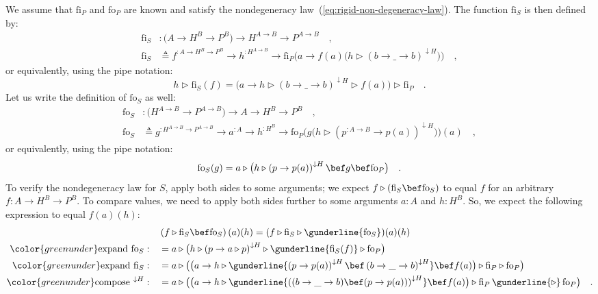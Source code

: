 We assume that $\text{fi}_{P}$ and $\text{fo}_{P}$ are known and
satisfy the nondegeneracy law~(\ref{eq:rigid-non-degeneracy-law}).
The function $\text{fi}_{S}$ is then defined by:
\begin{align*}
\text{fi}_{S} & :\big(A\rightarrow H^{B}\rightarrow P^{B}\big)\rightarrow H^{A\rightarrow B}\rightarrow P^{A\rightarrow B}\quad,\\
\text{fi}_{S} & \triangleq f^{:A\rightarrow H^{B}\rightarrow P^{B}}\rightarrow h^{:H^{A\rightarrow B}}\rightarrow\text{fi}_{P}\big(a\rightarrow f(a)\big(h\triangleright(b\rightarrow\_\rightarrow b)^{\downarrow H}\big)\big)\quad,
\end{align*}
or equivalently, using the pipe notation:
\[
h\triangleright\text{fi}_{S}(f)=\big(a\rightarrow h\triangleright\left(b\rightarrow\_\rightarrow b\right)^{\downarrow H}\triangleright f(a)\big)\triangleright\text{fi}_{P}\quad.
\]
Let us write the definition of $\text{fo}_{S}$ as well:
\begin{align*}
\text{fo}_{S} & :\big(H^{A\rightarrow B}\rightarrow P^{A\rightarrow B}\big)\rightarrow A\rightarrow H^{B}\rightarrow P^{B}\quad,\\
\text{fo}_{S} & \triangleq g^{:H^{A\rightarrow B}\rightarrow P^{A\rightarrow B}}\rightarrow a^{:A}\rightarrow h^{:H^{B}}\rightarrow\text{fo}_{P}\big(g\big(h\triangleright(p^{:A\rightarrow B}\rightarrow p(a))^{\downarrow H}\big)\big)(a)\quad,
\end{align*}
or equivalently, using the pipe notation:
\[
\text{fo}_{S}(g)=a\triangleright\big(h\triangleright\left(p\rightarrow p(a)\right)^{\downarrow H}\bef g\bef\text{fo}_{P}\big)\quad.
\]
To verify the nondegeneracy law for $S$, apply both sides to some
arguments; we expect $f\triangleright(\text{fi}_{S}\bef\text{fo}_{S})$
to equal $f$ for an arbitrary $f:A\rightarrow H^{B}\rightarrow P^{B}$.
To compare values, we need to apply both sides further to some arguments
$a:A$ and $h:H^{B}$. So, we expect the following expression to equal
$f(a)(h)$:
\begin{align*}
\quad & \left(f\triangleright\text{fi}_{S}\bef\text{fo}_{S}\right)(a)(h)=(f\triangleright\text{fi}_{S}\triangleright\gunderline{\text{fo}_{S}})(a)(h)\\
{\color{greenunder}\text{expand }\text{fo}_{S}:}\quad & =a\triangleright\big(h\triangleright\left(p\rightarrow a\triangleright p\right)^{\downarrow H}\triangleright\gunderline{\text{fi}_{S}(f)}\triangleright\text{fo}_{P}\big)\\
{\color{greenunder}\text{expand }\text{fi}_{S}:}\quad & =a\triangleright\big(\big(a\rightarrow h\triangleright\gunderline{\left(p\rightarrow p(a)\right)^{\downarrow H}\bef\left(b\rightarrow\_\rightarrow b\right)^{\downarrow H}}\bef f(a)\big)\triangleright\text{fi}_{P}\triangleright\text{fo}_{P}\big)\\
{\color{greenunder}\text{compose }^{\downarrow H}:}\quad & =a\triangleright\big(\big(a\rightarrow h\triangleright\gunderline{\left((b\rightarrow\_\rightarrow b)\bef(p\rightarrow p(a))\right)^{\downarrow H}}\bef f(a)\big)\triangleright\text{fi}_{P}\,\gunderline{\triangleright}\,\text{fo}_{P}\big)\quad.
\end{align*}
